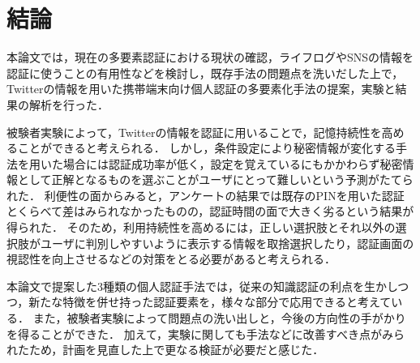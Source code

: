 \chapter{結論}\label{chap:conclusion}
本論文では，現在の多要素認証における現状の確認，ライフログやSNSの情報を認証に使うことの有用性などを検討し，既存手法の問題点を洗いだした上で，Twitterの情報を用いた携帯端末向け個人認証の多要素化手法の提案，実験と結果の解析を行った．

被験者実験によって，Twitterの情報を認証に用いることで，記憶持続性を高めることができると考えられる．
しかし，条件設定により秘密情報が変化する手法を用いた場合には認証成功率が低く，設定を覚えているにもかかわらず秘密情報として正解となるものを選ぶことがユーザにとって難しいという予測がたてられた．
利便性の面からみると，アンケートの結果では既存のPINを用いた認証とくらべて差はみられなかったものの，認証時間の面で大きく劣るという結果が得られた．
そのため，利用持続性を高めるには，正しい選択肢とそれ以外の選択肢がユーザに判別しやすいように表示する情報を取捨選択したり，認証画面の視認性を向上させるなどの対策をとる必要があると考えられる．

本論文で提案した3種類の個人認証手法では，従来の知識認証の利点を生かしつつ，新たな特徴を併せ持った認証要素を，様々な部分で応用できると考えている．
また，被験者実験によって問題点の洗い出しと，今後の方向性の手がかりを得ることができた．
加えて，実験に関しても手法などに改善すべき点がみられたため，計画を見直した上で更なる検証が必要だと感じた．


\newpage
